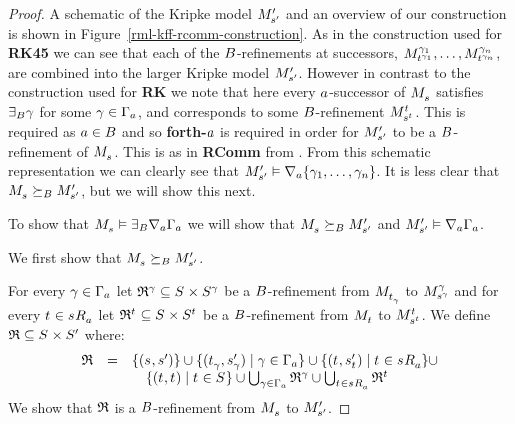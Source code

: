 \begin{proof}
A schematic of the Kripke model $\kPModelP{\kStateSP}$ and an overview of our construction is shown in Figure~\ref{rml-kff-rcomm-construction}.
As in the construction used for {\bf RK45} we can see that each of the $\agentsB$-refinements at successors, $\kPModel[\gamma_1]{\kStateT[\gamma_1]}, \dots, \kPModel[\gamma_n]{\kStateT[\gamma_n]}$, are combined into the larger Kripke model $\kPModelP{\kStateSP}$.
However in contrast to the construction used for {\bf RK} we note that here every $\agentA$-successor of $\kPModel{\kStateS}$ satisfies $\somerefsBs \gamma$ for some $\gamma \in \Gamma_\agentA$, and corresponds to some $\agentsB$-refinement $\kPModel[\kStateT]{\kStateS[\kStateT]}$.
This is required as $\agentA \in \agentsB$ and so {\bf forth-$\agentA$} is required in order for $\kPModelP{\kStateSP}$ to be a $\agentsB$-refinement of $\kPModel{\kStateS}$.
This is as in {\bf RComm} from \axiomRmlK{}.
From this schematic representation we can clearly see that $\kPModelP{\kStateSP} \entails \coversA \{\gamma_1, \dots, \gamma_n\}$.
It is less clear that $\kPModel{\kStateS} \simulatesBs \kPModelP{\kStateSP}$, but we will show this next.

To show that $\kPModel{\kStateS} \entails \somerefsBs \coversA \Gamma_\agentA$ we will show that $\kPModel{\kStateS} \simulatesBs \kPModelP{\kStateSP}$ and $\kPModelP{\kStateSP} \entails \coversA \Gamma_\agentA$.

We first show that $\kPModel{\kStateS} \simulatesBs \kPModelP{\kStateSP}$.

For every $\gamma \in \Gamma_\agentA$ let $\refinement^\gamma \subseteq \kStates \times \kStates[\gamma]$ be a $\agentsB$-refinement from $\kPModel{\kStateT_\gamma}$ to $\kPModel[\gamma]{\kStateS[\gamma]}$ and
for every $\kStateT \in \kSuccessorsA{\kStateS}$ let $\refinement^{\kStateT} \subseteq \kStates \times \kStates[\kStateT]$ be a $\agentsB$-refinement from $\kPModel{\kStateT}$ to $\kPModel[\kStateT]{\kStateS[\kStateT]}$.
We define $\refinement \subseteq \kStates \times \kStatesP$ where:
$$
\begin{array}{rcl}
    \refinement &=& \{(\kStateS, \kStateSP)\} \cup \{(\kStateT_\gamma, \kStateSP_\gamma) \mid \gamma \in \Gamma_\agentA\} \cup \{(\kStateT, \kStateSP_{\kStateT}) \mid \kStateT \in \kSuccessorsA{\kStateS}\} \cup \\&&\quad \{(\kStateT, \kStateT) \mid \kStateT \in \kStates\} \cup \bigcup_{\gamma \in \Gamma_\agentA} \refinement^\gamma \cup \bigcup_{\kStateT \in \kSuccessorsA{\kStateS}} \refinement^{\kStateT}
\end{array}
$$
We show that $\refinement$ is a $\agentsB$-refinement from $\kPModel{\kStateS}$ to $\kPModelP{\kStateSP}$.


\end{proof}
